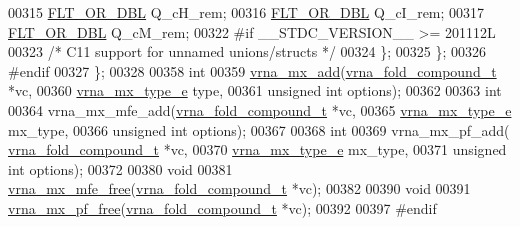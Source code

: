 \begin{DoxyCode}
00315       \hyperlink{group__data__structures_ga31125aeace516926bf7f251f759b6126}{FLT\_OR\_DBL}      Q\_cH\_rem;
00316       \hyperlink{group__data__structures_ga31125aeace516926bf7f251f759b6126}{FLT\_OR\_DBL}      Q\_cI\_rem;
00317       \hyperlink{group__data__structures_ga31125aeace516926bf7f251f759b6126}{FLT\_OR\_DBL}      Q\_cM\_rem;
00322 \textcolor{preprocessor}{#if \_\_STDC\_VERSION\_\_ >= 201112L}
00323     \textcolor{comment}{/* C11 support for unnamed unions/structs */}
00324     \};
00325   \};
00326 \textcolor{preprocessor}{#endif}
00327 \};
00328 
00358 \textcolor{keywordtype}{int}
00359 \hyperlink{group__dp__matrices_ga08661f098008961dab0023bf300f0c33}{vrna\_mx\_add}(\hyperlink{group__fold__compound_structvrna__fc__s}{vrna\_fold\_compound\_t} *vc,
00360             \hyperlink{group__dp__matrices_ga6042ea1d58d01931e959791be6d89343}{vrna\_mx\_type\_e} type,
00361             \textcolor{keywordtype}{unsigned} \textcolor{keywordtype}{int} options);
00362 
00363 \textcolor{keywordtype}{int}
00364 vrna\_mx\_mfe\_add(\hyperlink{group__fold__compound_structvrna__fc__s}{vrna\_fold\_compound\_t} *vc,
00365                 \hyperlink{group__dp__matrices_ga6042ea1d58d01931e959791be6d89343}{vrna\_mx\_type\_e} mx\_type,
00366                 \textcolor{keywordtype}{unsigned} \textcolor{keywordtype}{int} options);
00367 
00368 \textcolor{keywordtype}{int}
00369 vrna\_mx\_pf\_add( \hyperlink{group__fold__compound_structvrna__fc__s}{vrna\_fold\_compound\_t} *vc,
00370                 \hyperlink{group__dp__matrices_ga6042ea1d58d01931e959791be6d89343}{vrna\_mx\_type\_e} mx\_type,
00371                 \textcolor{keywordtype}{unsigned} \textcolor{keywordtype}{int} options);
00372 
00380 \textcolor{keywordtype}{void}
00381 \hyperlink{group__dp__matrices_ga6a9422feb5dfe5c64050cebf447672d0}{vrna\_mx\_mfe\_free}(\hyperlink{group__fold__compound_structvrna__fc__s}{vrna\_fold\_compound\_t} *vc);
00382 
00390 \textcolor{keywordtype}{void}
00391 \hyperlink{group__dp__matrices_ga2283e69fd139fb8e58d7ade3b5773f9c}{vrna\_mx\_pf\_free}(\hyperlink{group__fold__compound_structvrna__fc__s}{vrna\_fold\_compound\_t} *vc);
00392 
00397 \textcolor{preprocessor}{#endif}
\end{DoxyCode}

